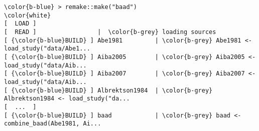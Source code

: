 \documentclass[class=minimal,border=0]{standalone}
\begin{document}
%
\begin{BVerbatim}[bgcolor=b-darkgrey]
\color{b-blue} > remake::make("baad")
\color{white}
[  LOAD ]
[  READ ]                 |  \color{b-grey} loading sources
[ {\color{b-blue}BUILD} ] Abe1981         | \color{b-grey} Abe1981 <- load_study("data/Abe1...
[ {\color{b-blue}BUILD} ] Aiba2005        | \color{b-grey} Aiba2005 <- load_study("data/Aib...
[ {\color{b-blue}BUILD} ] Aiba2007        | \color{b-grey} Aiba2007 <- load_study("data/Aib...
[ {\color{b-blue}BUILD} ] Albrektson1984  | \color{b-grey} Albrektson1984 <- load_study("da...
[  ...  ]
[ {\color{b-blue}BUILD} ] baad            | \color{b-grey} baad <- combine_baad(Abe1981, Ai...

\end{BVerbatim}
\end{document}
